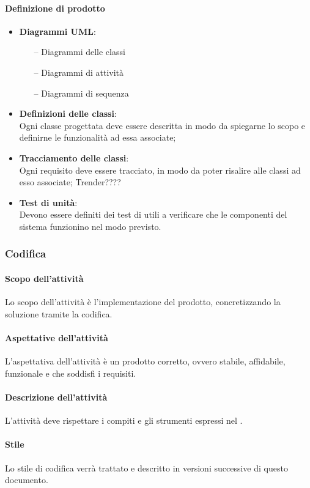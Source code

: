 \paragraph{Definizione di prodotto}
\begin{itemize}
	\item \textbf{Diagrammi UML}:
	\begin{itemize}
		\item[--] Diagrammi delle classi
		\item[--] Diagrammi di attività
		\item[--] Diagrammi di sequenza
	\end{itemize}
	\item \textbf{Definizioni delle classi}:\\Ogni classe progettata deve essere descritta in modo da spiegarne lo scopo e definirne le
funzionalità ad essa associate;
	\item \textbf{Tracciamento delle classi}:\\Ogni requisito deve essere tracciato, in modo da poter risalire alle classi ad esso associate; Trender????
	\item \textbf{Test di unità}:\\Devono essere definiti dei test di  utili a verificare che le componenti del sistema
funzionino nel modo previsto.
\end{itemize}

\subsubsection{Codifica}
 \paragraph{Scopo dell'attività}
 Lo scopo dell'attività è l'implementazione del prodotto, concretizzando la soluzione tramite la codifica.  
 \paragraph{Aspettative dell'attività}
 L'aspettativa dell'attività è un prodotto corretto, ovvero stabile, affidabile, funzionale e che soddisfi i requisiti. 
 \paragraph{Descrizione dell'attività}
 L'attività deve rispettare i compiti e gli strumenti espressi nel \PPdocRR.
 \paragraph{Stile}
 Lo stile di codifica verrà trattato e descritto in versioni successive di questo documento.

